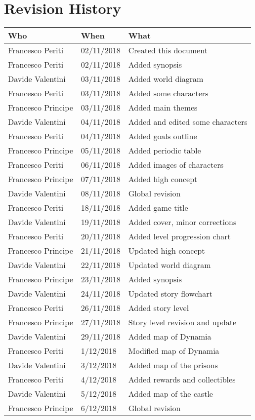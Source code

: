 \chapter*{Revision History}

\begin{longtable}[H]{|l|l|l|}
\hline
\cellcolor{lightgray}\textbf{Who} & \cellcolor{lightgray}\textbf{When} & \cellcolor{lightgray}\textbf{What} \\ \hline
Francesco Periti & 02/11/2018 & Created this document \\ \hline
Francesco Periti & 02/11/2018 & Added synopsis \\ \hline
Davide Valentini & 03/11/2018 & Added world diagram \\ \hline
Francesco Periti & 03/11/2018 & Added some characters \\ \hline
Francesco Principe & 03/11/2018 & Added main themes \\ \hline
Davide Valentini & 04/11/2018 & Added and edited some characters \\ \hline
Francesco Periti & 04/11/2018 & Added goals outline \\ \hline
Francesco Principe & 05/11/2018 & Added periodic table \\ \hline
Francesco Periti & 06/11/2018 & Added images of characters \\ \hline
Francesco Principe & 07/11/2018 & Added high concept \\ \hline
Davide Valentini & 08/11/2018 & Global revision \\ \hline

Francesco Periti & 18/11/2018 & Added game title \\ \hline
Davide Valentini & 19/11/2018 & Added cover, minor corrections \\ \hline
Francesco Periti & 20/11/2018 & Added level progression chart \\ \hline
Francesco Principe & 21/11/2018 & Updated high concept \\ \hline
Davide Valentini & 22/11/2018 & Updated world diagram \\ \hline
Francesco Principe & 23/11/2018 & Added synopsis \\ \hline
Davide Valentini & 24/11/2018 & Updated story flowchart \\ \hline
Francesco Periti & 26/11/2018 & Added story level \\ \hline
Francesco Principe & 27/11/2018 & Story level revision and update \\ \hline
Davide Valentini & 29/11/2018 & Added map of Dynamia \\ \hline
Francesco Periti & 1/12/2018 & Modified map of Dynamia \\ \hline
Davide Valentini & 3/12/2018 & Added map of the prisons \\ \hline
Francesco Periti & 4/12/2018 & Added rewards and collectibles \\ \hline
Davide Valentini & 5/12/2018 & Added map of the castle \\ \hline
Francesco Principe & 6/12/2018 & Global revision \\ \hline


\end{longtable}
